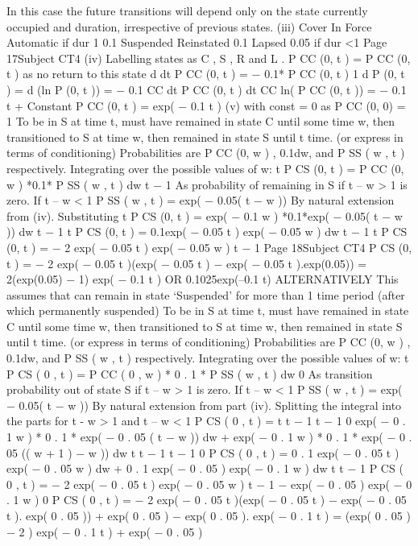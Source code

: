 \documentclass[a4paper,12pt]{article}
\begin{document}
In this case the future transitions will depend only on the state currently occupied and duration, irrespective of previous states.
(iii)
Cover In
Force
Automatic if dur 1
0.1
Suspended
Reinstated
0.1
Lapsed
0.05 if
dur <1
Page 17Subject CT4 %
(iv)
Labelling states as C , S , R and L .
P CC (0, t ) = P CC (0, t ) as no return to this state
d
dt
P CC (0, t ) = − 0.1* P CC (0, t )
1
d P (0, t ) = d (ln P (0, t )) = − 0.1
CC
dt
P CC (0, t ) dt CC
ln( P CC (0, t )) = − 0.1 t + Constant
P CC (0, t ) = exp( − 0.1 t )
(v)
with const = 0 as P CC (0, 0) = 1
To be in S at time t, must have remained in state C until some time w,
then transitioned to S at time w, then remained in state S until t time.
(or express in terms of conditioning)
Probabilities are P CC (0, w ) , 0.1dw, and P SS ( w , t ) respectively.
Integrating over the possible values of w:
t
P CS (0, t ) =
\int P CC (0, w ) *0.1* P SS ( w , t ) dw
t − 1
As probability of remaining in S if t – w > 1 is zero.
If t – w < 1
P SS ( w , t ) = exp( − 0.05( t − w ))
By natural extension from (iv).
Substituting
t
P CS (0, t ) =
\int exp( − 0.1 w ) *0.1*exp( − 0.05( t − w )) dw
t − 1
t
P CS (0, t ) = 0.1exp( − 0.05 t ) \int exp( − 0.05 w ) dw
t − 1
t
P CS (0, t ) = − 2 exp( − 0.05 t ) exp( − 0.05 w ) t − 1
Page 18Subject CT4 %
P CS (0, t ) = − 2 exp( − 0.05 t )(exp( − 0.05 t ) − exp( − 0.05 t ).exp(0.05))
= 2(exp(0.05) − 1) exp( − 0.1 t )
OR
0.1025exp(–0.1 t)
ALTERNATIVELY
This assumes that can remain in state ‘Suspended’ for more than 1 time period (after which permanently suspended)
To be in S at time t, must have remained in state C until some time w, then transitioned to S at time w, then remained in state S until t time.
(or express in terms of conditioning)
Probabilities are P CC (0, w ) , 0.1dw, and P SS ( w , t ) respectively.
Integrating over the possible values of w:
t
P CS ( 0 , t ) = \int P CC ( 0 , w ) * 0 . 1 * P SS ( w , t ) dw
0
As transition probability out of state S if t – w > 1 is zero.
If t – w < 1
P SS ( w , t ) = exp( − 0.05( t − w ))
By natural extension from part (iv).
Splitting the integral into the parts for t - w > 1 and t – w < 1
P CS ( 0 , t ) =
t t − 1
t − 1 0
\int exp( − 0 . 1 w ) * 0 . 1 * exp( − 0 . 05 ( t − w )) dw + \int exp( − 0 . 1 w ) * 0 . 1 * exp( − 0 . 05 (( w + 1 ) − w )) dw
t t − 1
t − 1 0
P CS ( 0 , t ) = 0 . 1 exp( − 0 . 05 t ) \int exp( − 0 . 05 w ) dw + 0 . 1 exp( − 0 . 05 ) \int exp( − 0 . 1 w ) dw
t
t − 1
P CS ( 0 , t ) = − 2 exp( − 0 . 05 t ) exp( − 0 . 05 w ) t − 1 − exp( − 0 . 05 ) exp( − 0 . 1 w ) 0
P CS ( 0 , t ) = − 2 exp( − 0 . 05 t )(exp( − 0 . 05 t ) − exp( − 0 . 05 t ). exp( 0 . 05 )) + exp( 0 . 05 ) − exp( 0 . 05 ). exp( − 0 . 1 t )
= (exp( 0 . 05 ) − 2 ) exp( − 0 . 1 t ) + exp( − 0 . 05 )
\end{document}
